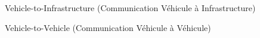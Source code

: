 \MyGlossary


\begin{abbreviations}
	\item[V2I] Vehicle-to-Infrastructure  (Communication Véhicule à Infrastructure)
	\item[V2V] Vehicle-to-Vehicle (Communication Véhicule à Véhicule)
\end{abbreviations}

